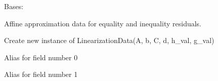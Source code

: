 \documentclass[letterpaper,10pt,english,openany,oneside]{sphinxmanual}
\begin{document}
\begin{fulllineitems}
\label{\detokenize{api/core/jaxmodel/approximations:jaxmodel.approximations.LinearizationData}}
\pysigstartsignatures
{}
\pysigstopsignatures
\sphinxAtStartPar
Bases: 

\sphinxAtStartPar
Affine approximation data for equality and inequality residuals.

\sphinxAtStartPar
Create new instance of LinearizationData(A, b, C, d, h\_val, g\_val)

\begin{fulllineitems}
\label{\detokenize{api/core/jaxmodel/approximations:jaxmodel.approximations.LinearizationData.A}}
\pysigstartsignatures
{}
\pysigstopsignatures
\sphinxAtStartPar
Alias for field number 0

\end{fulllineitems}


\begin{fulllineitems}
\label{\detokenize{api/core/jaxmodel/approximations:jaxmodel.approximations.LinearizationData.b}}
\pysigstartsignatures
{}
\pysigstopsignatures
\sphinxAtStartPar
Alias for field number 1

\end{fulllineitems}


\end{fulllineitems}
\end{document}

